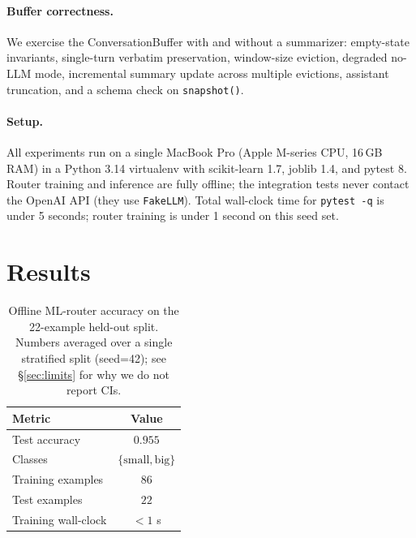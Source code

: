 \documentclass{article}
\begin{document}
\paragraph{Buffer correctness.} We exercise the ConversationBuffer with and
without a summarizer: empty-state invariants, single-turn verbatim
preservation, window-size eviction, degraded no-LLM mode, incremental
summary update across multiple evictions, assistant truncation, and a
schema check on \texttt{snapshot()}.

\paragraph{Setup.} All experiments run on a single MacBook Pro (Apple M-series
CPU, 16\,GB RAM) in a Python 3.14 virtualenv with scikit-learn 1.7, joblib
1.4, and pytest 8. Router training and inference are fully offline; the
integration tests never contact the OpenAI API (they use
\texttt{FakeLLM}). Total wall-clock time for \texttt{pytest -q} is under 5
seconds; router training is under 1 second on this seed set.

\section{Results}
\label{sec:results}

\begin{table}[h]
  \caption{Offline ML-router accuracy on the 22-example held-out split.
  Numbers averaged over a single stratified split (seed=42); see
  \S\ref{sec:limits} for why we do not report CIs.}
  \label{tab:router}
  \centering
  \begin{tabular}{lc}
    \toprule
    Metric & Value \\
    \midrule
    Test accuracy & $0.955$ \\
    Classes & $\{\mathrm{small}, \mathrm{big}\}$ \\
    Training examples & $86$ \\
    Test examples & $22$ \\
    Training wall-clock & $<1$ s \\
    \bottomrule
  \end{tabular}
\end{table}
\end{document}
